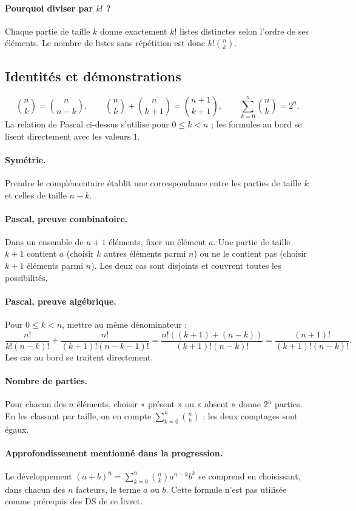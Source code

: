 \paragraph{Pourquoi diviser par $k!$ ?} Chaque partie de taille $k$ donne exactement $k!$ listes distinctes selon l'ordre de ses éléments. Le nombre de listes sans répétition est donc $k!\binom nk$.
\subsection{Identités et démonstrations}
\[\binom nk=\binom n{n-k},\qquad \binom nk+\binom n{k+1}=\binom{n+1}{k+1},\qquad\sum_{k=0}^n\binom nk=2^n.\]
La relation de Pascal ci-dessus s'utilise pour $0\le k<n$ ; les formules au bord se lisent directement avec les valeurs $1$.
\paragraph{Symétrie.} Prendre le complémentaire établit une correspondance entre les parties de taille $k$ et celles de taille $n-k$.
\paragraph{Pascal, preuve combinatoire.} Dans un ensemble de $n+1$ éléments, fixer un élément $a$. Une partie de taille $k+1$ contient $a$ (choisir $k$ autres éléments parmi $n$) ou ne le contient pas (choisir $k+1$ éléments parmi $n$). Les deux cas sont disjoints et couvrent toutes les possibilités.
\paragraph{Pascal, preuve algébrique.} Pour $0\le k<n$, mettre au même dénominateur :
\[\frac{n!}{k!(n-k)!}+\frac{n!}{(k+1)!(n-k-1)!}
=\frac{n!((k+1)+(n-k))}{(k+1)!(n-k)!}
=\frac{(n+1)!}{(k+1)!(n-k)!}.\]
Les cas au bord se traitent directement.
\paragraph{Nombre de parties.} Pour chacun des $n$ éléments, choisir « présent » ou « absent » donne $2^n$ parties. En les classant par taille, on en compte $\sum_{k=0}^n\binom nk$ : les deux comptages sont égaux.
\paragraph{Approfondissement mentionné dans la progression.} Le développement $(a+b)^n=\sum_{k=0}^n\binom nk a^{n-k}b^k$ se comprend en choisissant, dans chacun des $n$ facteurs, le terme $a$ ou $b$. Cette formule n'est pas utilisée comme prérequis des DS de ce livret.


